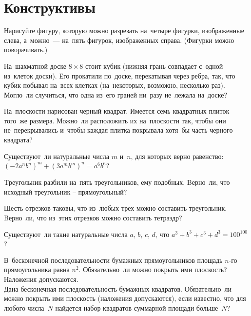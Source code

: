 
\section*{Конструктивы}


\begin{problems}

\item
Нарисуйте фигуру, которую можно разрезать на~четыре фигурки, изображенные
слева, а~можно~--- на~пять фигурок, изображенных справа.
(Фигурки можно поворачивать.)
\begin{center}
\qquad
\end{center}

\item
На~шахматной доске $8 \times 8$ стоит кубик
(нижняя грань совпадает с~одной из~клеток доски).
Его прокатили по~доске, перекатывая через ребра, так, что кубик побывал на~всех
клетках (на~некоторых, возможно, несколько раз).
Могло~ли случиться, что одна из~его граней ни~разу не~лежала на~доске?

\item
На~плоскости нарисован черный квадрат.
Имеется семь квадратных плиток того~же размера.
Можно~ли расположить их на~плоскости так, чтобы они не~перекрывались и~чтобы
каждая плитка покрывала хотя~бы часть черного квадрата?

\item
Существуют~ли натуральные числа $m$ и~$n$, для которых верно равенство:
$(-2 a^n b^n)^m + (3 a^m b^m)^n = a^6 b^6$?

\item
Tреугольник разбили на~пять треугольников, ему подобных.
Bерно~ли, что исходный треугольник -- прямоугольный?

\item
Шесть отрезков таковы, что из~любых трех можно составить треугольник.
Bерно~ли, что из~этих отрезков можно составить тетраэдр?

\item
Существуют~ли такие натуральные числа $a$, $b$, $c$, $d$, что
$a^3 + b^3 + c^3 + d^3 = 100^{100}$?

\item
\subproblem
В~бесконечной последовательности бумажных прямоугольников площадь $n$-го
прямоугольника равна $n^2$.
Обязательно~ли можно покрыть ими плоскость?
Наложения допускаются.
\\
\subproblem
Дана бесконечная последовательность бумажных квадратов.
Обязательно~ли можно покрыть ими плоскость (наложения допускаются), если
известно, что для любого числа~$N$ найдется набор квадратов суммарной площади
больше~$N$?

\end{problems}

